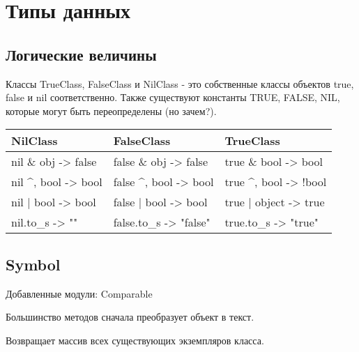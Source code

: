 \chapter{Типы данных}

\section{Логические величины}

Классы TrueClass, FalseClass и NilClass - это собственные классы объектов true, false и nil соответственно. Также существуют константы TRUE, FALSE, NIL, которые могут быть переопределены (но зачем?).

\begin{longtable}{ | * {3} { l |}}
\hline
NilClass & FalseClass & TrueClass \\ \hline
nil \& obj -> false & false \& obj -> false & true \& bool -> bool \\ \hline
nil \textasciicircum\-, bool -> bool & false \textasciicircum\-, bool -> bool & true \textasciicircum\-, bool -> !bool \\ \hline
nil | bool -> bool & false | bool -> bool & true | object -> true \\ \hline
nil.to_s -> "" & false.to_s -> "false" & true.to_s -> "true" \\ \hline
\end{longtable}

\begin{methodlist}






\end{methodlist}

\section{Symbol}

Добавленные модули: Comparable

Большинство методов сначала преобразует объект в текст.

\begin{methodlist}
  Возвращает массив всех существующих экземпляров класса.
\end{methodlist}

